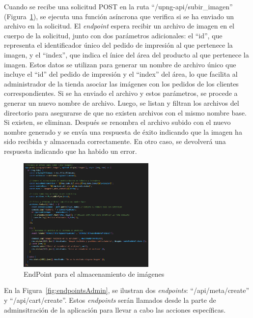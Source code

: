 \documentclass[11pt]{article}
\begin{document}
Cuando se recibe una solicitud POST en la ruta ``/upng-api/subir\_imagen'' (Figura~\ref{fig:endpointImagen}), se ejecuta una función asíncrona que verifica si se ha enviado
un archivo en la solicitud. El \textit{endpoint} espera recibir un archivo de imagen en el cuerpo de la solicitud, junto con dos parámetros adicionales: el ``id'', que 
representa el identificador único del pedido de impresión al que pertenece la imagen, y el ``index'', que indica el ínice del área del producto al 
que pertenece la imagen. Estos datos se utilizan para generar un nombre de archivo único que incluye el ``id'' del pedido de impresión y el ``index'' del área,
lo que facilita al administrador de la tienda asociar las imágenes con los pedidos de los clientes correspondientes. Si se ha enviado el archivo y estos parámetros, se procede a generar un nuevo nombre de archivo. Luego, se listan y filtran los archivos del directorio para asegurarse de que no existen
archivos con el mismo nombre base. Si existen, se eliminan. Después se renombra el archivo subido con el nuevo nombre generado y se envía una respuesta de éxito indicando
que la imagen ha sido recibida y almacenada correctamente. En otro caso, se devolverá una respuesta indicando que ha habido un error. 


\begin{figure}[H]
    \centering
    \includegraphics[width=0.6\textwidth]{imagenes-back/endpointSubirImagen.png}
    \caption{\label{fig:endpointImagen} EndPoint para el almacenamiento de imágenes }
    \vspace{\fill}
\end{figure}

En la Figura~\ref{fig:endpointsAdmin}, se ilustran dos \textit{endpoints}: ``/api/meta/create'' y ``/api/cart/create''. Estos \textit{endpoints} serán
llamados desde la parte de adminsitración de la aplicación para llevar a cabo las acciones específicas.
\end{document}
